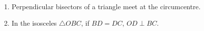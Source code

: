 \begin{enumerate}[label=\thesection.\arabic*.,ref=\thesection.\theenumi]
\label{prob:tri_perp_bisect}
%
\iffalse
\\
\solution From \eqref{eq:circle_const_chord_bc}, 
%
\begin{align}
\brak{\vec{B}-\vec{C}}^T\vec{O} &=   \frac{\norm{\vec{B}}^2- \norm{\vec{C}}^2}{2}
\\
\implies \brak{\vec{B}-\vec{C}}^T\vec{O} &=   \frac{1}{2}\brak{\vec{B}- \vec{C}}^T\brak{\vec{B}+ \vec{C}}
\\
\implies \brak{\vec{B}-\vec{C}}^T&\brak{\vec{O} - \frac{\vec{B}+\vec{C}}{2}} = 0
\\
\text{or, } \brak{\vec{B}-\vec{C}}^T&\brak{\vec{O} - \vec{D}} = 0
\end{align}
%
$\because \vec{D} = \frac{\vec{B}+\vec{C}}{2}$ is the mid point of $BC$.  From \eqref{eq:tri_baudh_orth} we then conclude that $OD \perp BC$.
\fi
%
\item Perpendicular bisectors of a triangle meet at the circumcentre.
%
\item In the isosceles $\triangle OBC$, if $BD = DC$, $OD \perp BC$.
\label{them:isos_pb}
\iffalse


\end{enumerate}
